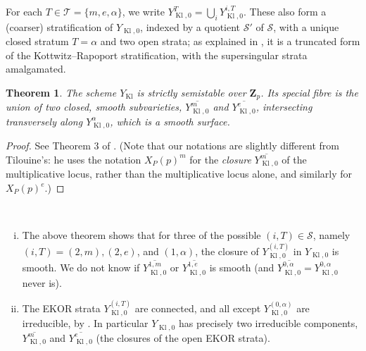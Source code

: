 \documentclass[cjm]{ipart}
\theoremstyle{plain}
\newtheorem{theorem}{Theorem}[subsection]
\theoremstyle{remark}
\DeclareMathOperator{\Kl}{Kl}
\newcommand{\Zp}{\mathbf{Z}_p}
\newcommand{\cS}{\mathcal{S}}
\newcommand{\cT}{\mathcal{T}}
\numberwithin{equation}{subsection}
\begin{document}
  For each $T \in \cT = \{m, e, \alpha\}$, we write $Y^T_{\Kl, 0} = \bigcup_i Y^{i, T}_{\Kl, 0}$. These also form a (coarser) stratification of $Y_{\Kl, 0}$, indexed by a quotient $\cS'$ of $\cS$, with a unique closed stratum $T = \alpha$ and two open strata; as explained in \cite{shenyuzhang21}, it is a truncated form of the Kottwitz--Rapoport stratification, with the supersingular strata amalgamated.

  \begin{theorem}\label{thm:Klingenstrata}
   The scheme $Y_{\Kl}$ is strictly semistable over $\Zp$. Its special fibre is the union of two closed, smooth subvarieties, $\overline{Y_{\Kl, 0}^m}$ and $\overline{Y_{\Kl, 0}^e}$, intersecting transversely along $Y_{\Kl, 0}^\alpha$, which is a smooth surface.
  \end{theorem}

  \begin{proof}
   See Theorem 3 of \cite{tilouine06}. (Note that our notations are slightly different from Tilouine's: he uses the notation $X_P(p)^m$ for the \emph{closure} $\overline{Y_{\Kl, 0}^m}$ of the multiplicative locus, rather than the multiplicative locus alone, and similarly for $X_P(p)^e$.)
  \end{proof}

  \begin{remark} \
   \begin{enumerate}[(i)]
    \item The above theorem shows that for three of the possible $(i, T) \in \cS$, namely $(i, T) = (2, m), (2, e)$, and $(1, \alpha)$, the closure of $Y^{(i, T)}_{\Kl, 0}$ in $Y_{\Kl, 0}$ is smooth. We do not know if $\overline{Y^{1, m}_{\Kl, 0}}$ or $\overline{Y^{1, e}_{\Kl, 0}}$ is smooth (and $\overline{Y^{0, \alpha}_{\Kl, 0}} = Y^{0, \alpha}_{\Kl, 0}$ never is).
    \item The EKOR strata $Y_{\Kl,0}^{(i, T)}$ are connected, and all except $Y_{\Kl, 0}^{(0, \alpha)}$ are irreducible, by \cite[Proposition 6.3.5]{shenyuzhang21}. In particular $Y_{\Kl, 0}$ has precisely two irreducible components, $\overline{Y_{\Kl,0}^{m}}$ and $\overline{Y_{\Kl,0}^{e}}$ (the closures of the open EKOR strata). \qedhere
   \end{enumerate}
  \end{remark}
\end{document}
